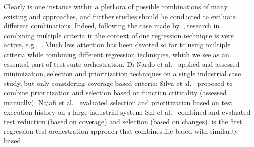 
Clearly \fz is one instance within a plethora of possible combinations of many existing \tcs and \tcp approaches, and further studies should be conducted to evaluate  different combinations.
Indeed, following the case made by~\citet{harman2011making},
research in combining multiple criteria in the context of one regression technique is very active, e.g.,~\cite{epitropakis2015empirical,garousi2018multi}.
Much less attention has been devoted so far to using multiple criteria while combining different regression techniques, which we see as an essential part of test suite orchestration.
Di Nardo et al.~\cite{di2015coverage} applied and assessed minimization, selection and prioritization techniques on a single industrial case study, but only considering coverage-based criteria;  Silva et al.~\cite{silva2016hybrid} proposed to combine prioritization and selection based on function criticality (assessed manually); Najafi et al.~\cite{najafi_improving_2019} evaluated selection and prioritization based on test execution history on a large industrial system;
Shi et al.~\cite{shi2015comparing} combined and evaluated test reduction (based on coverage) and selection (based on changes). 
\fz is the first regression test orchestration approach that combines file-based \tcs with similarity-based \tcp.

